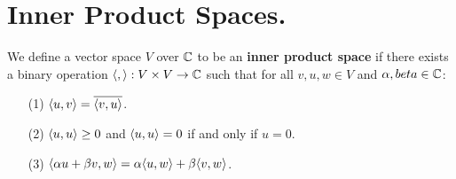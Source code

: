 
\section{Inner Product Spaces.}
\label{section1}

\begin{definition}
    We define a vector space $V$ over $\mathbb{C}$ to be an  \textbf{inner product space} if there
    exists a binary operation $\langle ,\rangle:V \times V \rightarrow \mathbb{C} $ such that for all  $v,u,w \in V$
    and  $\alpha, beta \in \mathbb{C}$:
        \begin{enumerate}
            \item[(1)] $\langle u,v\rangle=\overline{\langle v,u\rangle}$.

            \item[(2)] $\langle u,u\rangle \geq 0$ and $\langle u,u\rangle = 0$ if and only if  $u=0$.

            \item[(3)] $\langle \alpha u+\beta v, w\rangle=\alpha\langle u,w\rangle+\beta\langle v,w\rangle$.

        \end{enumerate}
\end{definition}

